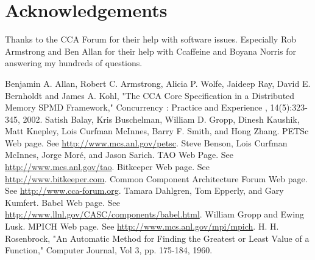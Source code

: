 \documentclass[doublespacing,12pt]{article}
\begin{document}
\section{Acknowledgements}
Thanks to the CCA Forum for their help with software issues.  Especially Rob Armstrong and Ben Allan for their help with Ccaffeine and Boyana Norris for answering my hundreds of questions.




\begin{thebibliography}{2}
  Benjamin A. Allan, Robert C. Armstrong, Alicia P. Wolfe, Jaideep
  Ray, David E. Bernholdt and James A. Kohl, 
  "The CCA Core Specification in a Distributed Memory SPMD Framework,"  
  Concurrency : Practice and Experience , 14(5):323-345, 2002.
  Satish Balay, Kris Buschelman, William D. Gropp, Dinesh Kaushik,
  Matt Knepley, Lois Curfman McInnes, Barry F. Smith, and Hong Zhang.
  PETSc Web page.  See \url{http://www.mcs.anl.gov/petsc}.
  Steve Benson, Lois Curfman McInnes, Jorge Mor\'e, and Jason Sarich.  
  TAO Web Page.  See \url{http://www.mcs.anl.gov/tao}.
  Bitkeeper Web page.  See \url{http://www.bitkeeper.com}.
  Common Component Architecture Forum Web page.  
  See \url{http://www.cca-forum.org}.
  Tamara Dahlgren, Tom Epperly, and Gary Kumfert.  Babel Web page.
  See \url{http://www.llnl.gov/CASC/components/babel.html}.
  William Gropp and Ewing Lusk.  MPICH Web page.  See
  \url{http://www.mcs.anl.gov/mpi/mpich}.
  H. H. Rosenbrock, "An Automatic Method for Finding the Greatest or Least Value of a Function," Computer Journal, Vol 3, pp. 175-184, 1960.
\end{thebibliography}
\end{document}
